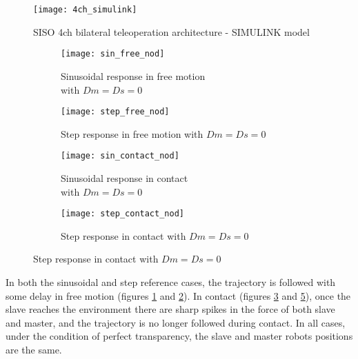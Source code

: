 \begin{figure}[H]
\centering
\texttt{[image: 4ch\_simulink]}
\caption{SISO 4ch bilateral teleoperation architecture - SIMULINK model}
\end{figure}

\newpage

\begin{figure}[H]
\begin{minipage}{0.5\textwidth}
\begin{figure}[H]
\texttt{[image: sin\_free\_nod]}
\caption{Sinusoidal response in free motion\\ with $Dm=Ds=0$}
\label{fig:sin_free_nod}
\end{figure}
\begin{figure}[H]
\texttt{[image: step\_free\_nod]}
\caption{Step response in free motion with $Dm=Ds=0$}
\label{fig:step_free_nod}
\end{figure}
\end{minipage}
\begin{minipage}{0.5\textwidth}
\begin{figure}[H]
\texttt{[image: sin\_contact\_nod]}
\caption{Sinusoidal response in contact\\ with $Dm=Ds=0$}
\label{fig:sin_contact_nod}
\end{figure}
\begin{figure}[H]
\texttt{[image: step\_contact\_nod]}
\caption{Step response in contact with $Dm=Ds=0$}
\label{fig:step_contact_nod}
\end{figure}
\end{minipage}
\end{figure}

In both the sinusoidal and step reference cases, the trajectory is followed with some delay in free motion (figures \ref{fig:sin_free_nod} and \ref{fig:step_free_nod}). In contact (figures \ref{fig:sin_contact_nod} and \ref{fig:step_contact_nod}), once the slave reaches the environment there are sharp spikes in the force of both slave and master, and the trajectory is no longer followed during contact. In all cases, under the condition of perfect transparency, the slave and master robots positions are the same.

\newpage

